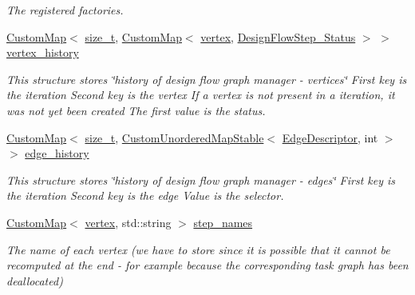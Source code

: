 \begin{DoxyCompactItemize}
\begin{DoxyCompactList}\small\item\em The registered factories. \end{DoxyCompactList}\item 
\hyperlink{custom__map_8hpp_a18ca01763abbe3e5623223bfe5aaac6b}{Custom\+Map}$<$ \hyperlink{tutorial__fpt__2017_2intro_2sixth_2test_8c_a7c94ea6f8948649f8d181ae55911eeaf}{size\+\_\+t}, \hyperlink{custom__map_8hpp_a18ca01763abbe3e5623223bfe5aaac6b}{Custom\+Map}$<$ \hyperlink{graph_8hpp_abefdcf0544e601805af44eca032cca14}{vertex}, \hyperlink{design__flow__step_8hpp_afb1f0d73069c26076b8d31dbc8ebecdf}{Design\+Flow\+Step\+\_\+\+Status} $>$ $>$ \hyperlink{classDesignFlowManager_a2ca7c1db5d0b6cbea2c118601cbe1948}{vertex\+\_\+history}
\begin{DoxyCompactList}\small\item\em This structure stores \char`\"{}history of design flow graph manager -\/ vertices\char`\"{} First key is the iteration Second key is the vertex If a vertex is not present in a iteration, it was not yet been created The first value is the status. \end{DoxyCompactList}\item 
\hyperlink{custom__map_8hpp_a18ca01763abbe3e5623223bfe5aaac6b}{Custom\+Map}$<$ \hyperlink{tutorial__fpt__2017_2intro_2sixth_2test_8c_a7c94ea6f8948649f8d181ae55911eeaf}{size\+\_\+t}, \hyperlink{custom__map_8hpp_a7314a7df1cdb3a3acf478ab86e95c226}{Custom\+Unordered\+Map\+Stable}$<$ \hyperlink{graph_8hpp_a9eb9afea34e09f484b21f2efd263dd48}{Edge\+Descriptor}, int $>$ $>$ \hyperlink{classDesignFlowManager_ad81eea42b4dd034b2ba9a5b61dcb84bf}{edge\+\_\+history}
\begin{DoxyCompactList}\small\item\em This structure stores \char`\"{}history of design flow graph manager -\/ edges\char`\"{} First key is the iteration Second key is the edge Value is the selector. \end{DoxyCompactList}\item 
\hyperlink{custom__map_8hpp_a18ca01763abbe3e5623223bfe5aaac6b}{Custom\+Map}$<$ \hyperlink{graph_8hpp_abefdcf0544e601805af44eca032cca14}{vertex}, std\+::string $>$ \hyperlink{classDesignFlowManager_aab1b4d4f34b44e99076f1c8c0bef18f0}{step\+\_\+names}
\begin{DoxyCompactList}\small\item\em The name of each vertex (we have to store since it is possible that it cannot be recomputed at the end -\/ for example because the corresponding task graph has been deallocated) \end{DoxyCompactList}\item 

\end{DoxyCompactItemize}
